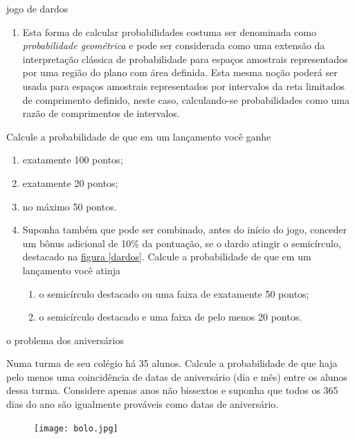 \begin{task}{jogo de dardos}
\begin{enumerate}
\item {} 
Esta forma de calcular probabilidades costuma ser denominada como \emph{probabilidade geométrica} e pode ser considerada como uma extensão da interpretação clássica de probabilidade para espaços amostrais representados por uma região do plano com área definida. Esta mesma noção poderá ser usada para espaços amostrais representados por intervalos da reta limitados de comprimento definido, neste caso, calculando-se probabilidades como uma razão de comprimentos de intervalos.

\end{enumerate}

Calcule a probabilidade de que em um lançamento você ganhe
\begin{enumerate}
\item {} 
exatamente 100 pontos;

\item {} 
exatamente 20 pontos;

\item {} 
no máximo 50 pontos.

\item {} 
Suponha também que pode ser combinado, antes do início do jogo, conceder um bônus adicional de 10\% da pontuação, se o dardo atingir o semicírculo, destacado na \hyperref[dardos]{figura \ref{dardos}}. Calcule a probabilidade de que em um lançamento você atinja
\begin{enumerate}
\item {} 
o semicírculo destacado ou uma faixa de exatamente 50 pontos;

\item {} 
o semicírculo destacado e uma faixa de pelo menos 20 pontos.

\end{enumerate}

\end{enumerate}
\end{task}

\begin{task}{o problema dos aniversários}


Numa turma de seu colégio há 35 alunos. Calcule a probabilidade de que haja pelo menos uma coincidência de datas de aniversário (dia e mês) entre os alunos dessa turma. Considere apenas anos não bissextos e suponha que todos os 365 dias do ano são igualmente prováveis como datas de aniversário.

\begin{figure}[H]
\centering

\noindent\texttt{[image: bolo.jpg]}
\end{figure}
\end{task}



